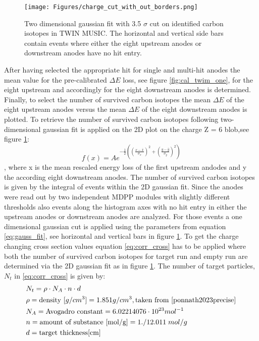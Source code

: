 \begin{figure}[htpb]
    \centering
    \texttt{[image: Figures/charge\_cut\_with\_out\_borders.png]}
    \caption{
    Two dimensional gaussian fit with 3.5 $\sigma$ cut  on identified carbon isotopes in TWIN MUSIC. The horizontal and vertical side bars contain events where either the eight upstream anodes or downstream anodes have no hit entry.
    }
    \label{fig:twin_2d_gaus_cut}
\end{figure}

After having selected the appropriate hit for single and multi-hit anodes the mean value for the pre-calibrated $\Delta E$ loss, see figure \ref{fig:cal_twim_one}, for the eight upstream and accordingly for the eight downstream anodes is determined. Finally, to select the number of survived carbon isotopes the mean $\Delta E$ of the eight upstream anodes versus the mean $\Delta E$ of the eight downstream anodes is plotted. To retrieve the number of survived carbon isotopes following two-dimensional gaussian fit is applied on the 2D plot on the charge Z = 6 blob,see figure \ref{fig:twin_2d_gaus_cut}:
\begin{equation}
f(x) = A e^{-\frac{1}{2}((\frac{x - \bar{x}}{\sigma_{x}})^2 +(\frac{y - \bar{y}}{\sigma_{y}})^2)}
\label{eq:gauss_fit}
\end{equation},
where x is the mean rescaled energy loss of the first upstream andodes and y the according eight downstream anodes. The number of survived carbon isotopes is given by the integral of events within the 2D gaussian fit. Since the anodes were read out by two independent MDPP modules with slightly different thresholds also events along the histogram axes with no hit entry in either the upstream anodes or downstream anodes are analyzed. For those events a one dimensional gaussian cut is applied using the parameters from equation \ref{eq:gauss_fit}, see horizontal and vertical bars in figure \ref{fig:twin_2d_gaus_cut}.\newline
To get the charge changing cross section values equation \ref{eq:corr_cross} has to be applied where both the number of survived  carbon isotopes for target run and empty run are determined via the 2D gaussian fit as in figure \ref{fig:twin_2d_gaus_cut}. The number of target particles, $N_t$ in \ref{eq:corr_cross} is given by:
\begin{equation}
\begin{split}
&N_t = \rho \cdot N_A \cdot n \cdot d\\ 
&\rho = \text{density [$g/cm^3$]} = 1.851 g/cm^3,\text{taken from \cite{ponnath2023precise}}\\
&N_A = \text{Avogadro constant} =  6.02214076 \cdot 10^{23} mol^{-1}\\
&n = \text{amount of substance [mol/g]} = 1./12.011 \; mol/g\\
&d = \text{target thickness[cm]}
\end{split}
\end{equation}
